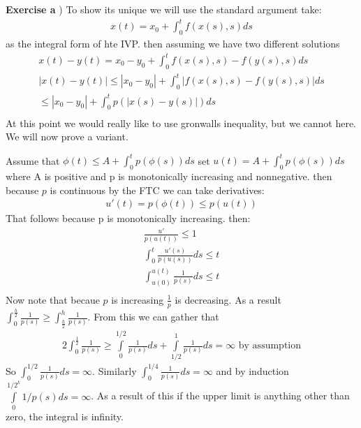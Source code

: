 \documentclass[12pt]{article}
\newenvironment{exercise}[1]{\vspace{.1in}\noindent\textbf{Exercise #1 \hspace{.05em}}}{}
\begin{document}
\begin{exercise}{2.2}

	a)
	To show its unique we will use  the standard argument take:
	\begin{align}
		x(t)=x_0+\int_0^tf(x(s),s)ds
	\end{align}
	as the integral form of hte IVP. then assuming we have two different solutions
	\begin{align}
		x(t)-y(t)=x_0-y_0+\int_0^t f(x(s),s)-f(y(s),s)ds          \\
		|x(t)-y(t)|\leq|x_0-y_0|+\int_0^t |f(x(s),s)-f(y(s),s)|ds \\
		\leq|x_0-y_0|+\int_0^t p(|x(s)-y(s)|)ds                   \\
	\end{align}
	At this point we would really like to use gronwalls inequality, but we cannot here. We will now prove a variant.

	Assume that $\phi(t)\leq A+\int_0^tp(\phi(s))ds$
	set $u(t)=A+\int_0^tp(\phi(s))ds$ where A is positive and p is monotonically increasing and nonnegative. then because $p$ is continuous by the FTC we can take derivatives:
	\begin{align}
		u'(t)=p(\phi(t))\leq p(u(t))
	\end{align}
	That follows because p is monotonically increasing. then:
	\begin{align}
		\frac{u'}{p(u(t))}\leq1                   \\
		\int_0^t \frac{u'(s)}{p(u(s))}ds\leq t    \\
		\int_{u(0)}^{u(t)} \frac{1}{p(s)}ds\leq t \\
	\end{align}
	Now note that becaue $p$ is increasing $\frac{1}{p}$ is decreasing. As a result $\int_0^\frac{h}{2}\frac{1}{p(s)}\geq \int_\frac{h}{2}^h \frac{1}{p(s)}$. From this we can gather that
	\begin{align}
		2\int_0^\frac{1}{2} \frac{1}{p(s)} \geq \int\limits_{0}^{1/2} \frac{1}{p(s)} ds +\int\limits_{1/2}^{1} \frac{1}{p(s)} ds = \infty \text{ by assumption}
	\end{align}
	So $\int_0^{1/2} \frac{1}{p(s)} ds = \infty$. Similarly $\int_0^{1/4} \frac{1}{p(s)}ds=\infty$ and by induction $\int\limits_{0}^{1/2^k}1/p(s)ds = \infty$. As a result of this if the upper limit is anything other than zero, the integral is infinity.


\end{exercise}
\end{document}
